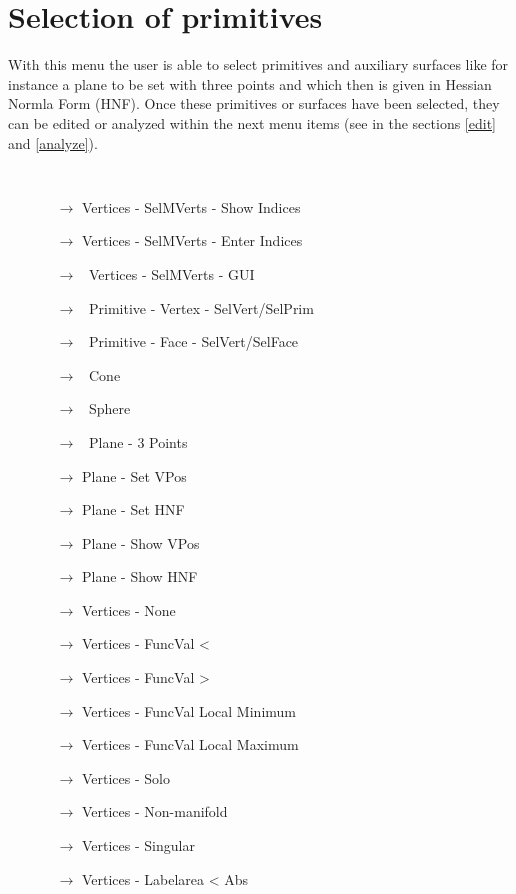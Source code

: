  \section{Selection of primitives}\label{select}
 With this menu the user is able to select primitives and auxiliary surfaces like for instance a plane to be set with three points and which then is given in Hessian Normla Form (HNF). Once these primitives or surfaces have been selected, they can be edited or analyzed within the next menu items (see in the sections \ref{edit} and \ref{analyze}).
{\tt
\begin{itemize}
\item[] 
 \begin{itemize}
 \item[$\rightarrow$]  Vertices - SelMVerts - Show Indices
 \item[$\rightarrow$] 	Vertices - SelMVerts - Enter Indices
 \item[$\rightarrow$]  \textopenbullet\ Vertices - SelMVerts - GUI
 \item[$\rightarrow$] 	 \textbullet\ Primitive - Vertex - SelVert/SelPrim
 \item[$\rightarrow$] 	 \textopenbullet\ Primitive - Face - SelVert/SelFace
 \item[$\rightarrow$] 	 \textopenbullet\ Cone
 \item[$\rightarrow$] 	 \textopenbullet\ Sphere
 \item[$\rightarrow$] 	\textopenbullet\ Plane - 3 Points
 \item[$\rightarrow$] 	Plane - Set VPos
 \item[$\rightarrow$] 	Plane - Set HNF
 \item[$\rightarrow$] 	Plane - Show VPos
 \item[$\rightarrow$] 	Plane - Show HNF
 \item[$\rightarrow$]  Vertices - None
 \item[$\rightarrow$] 	Vertices - FuncVal <
 \item[$\rightarrow$] 	Vertices - FuncVal >
 \item[$\rightarrow$] Vertices - FuncVal Local Minimum
 \item[$\rightarrow$] Vertices - FuncVal Local Maximum
 \item[$\rightarrow$] Vertices - Solo
 \item[$\rightarrow$] Vertices - Non-manifold
 \item[$\rightarrow$] Vertices - Singular
 \item[$\rightarrow$] Vertices - Labelarea < Abs

\end{itemize}
\end{itemize}}
